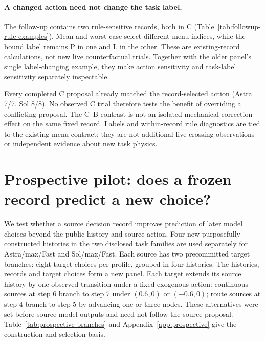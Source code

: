 

\paragraph{A changed action need not change the task label.}
The follow-up contains two rule-sensitive records, both in C
(Table~\ref{tab:followup-rule-examples}). Mean and worst case select different
menu indices, while the bound label remains P in one and L in the other.
These are existing-record calculations, not new live counterfactual trials.
Together with the older panel's single label-changing example, they make
action sensitivity and task-label sensitivity separately inspectable.



Every completed C proposal already matched the record-selected action
(Astra 7/7, Sol 8/8). No observed C trial therefore tests the benefit of
overriding a conflicting proposal. The C--B contrast is not an isolated
mechanical correction effect on the same fixed record. Labels and
within-record rule diagnostics are tied to the existing menu contract;
they are not additional live crossing observations or independent evidence
about new task physics.

\section{Prospective pilot: does a frozen record predict a new choice?}
\label{sec:prospective}
We test whether a source decision record improves prediction of later model
choices beyond the public history and source action. Four new purposefully
constructed histories in the two disclosed task families are used separately
for Astra/max/Fast and Sol/max/Fast. Each source has two precommitted target
branches: eight target choices per profile, grouped in four histories.
The histories, records and target choices form a new panel. Each target
extends its source history by one observed transition under a fixed exogenous
action: continuous sources at step 6 branch to step 7 under $(0.6,0)$ or
$(-0.6,0)$; route sources at step 4 branch to step 5 by advancing one or three
nodes. These alternatives were set before source-model outputs and need not
follow the source proposal. Table~\ref{tab:prospective-branches} and
Appendix~\ref{app:prospective} give the construction and selection basis.


